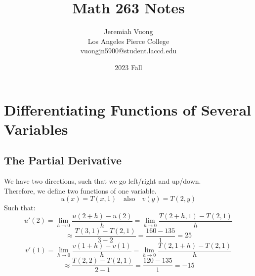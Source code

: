 \documentclass{article}
\title{\Huge{Math 263} Notes}
\author{\huge{Jeremiah Vuong}\\Los Angeles Pierce College\\vuongjn5900@student.laccd.edu
}
\date{2023 Fall}
\begin{document}
\maketitle
\newpage
{}
\pagebreak

\setcounter{section}{13}
\section{Differentiating Functions of Several Variables}
\subsection{The Partial Derivative}
\sol We have two directions, such that we go left/right and up/down.
\\ Therefore, we define two functions of one variable.
$$ u(x) = T(x, 1) \quad \text{also} \quad v(y) = T(2, y)$$
Such that:
$$ u'(2) = \lim _{h \rightarrow 0} \frac{u(2+h)-u(2)}{h} = \lim _{h \rightarrow 0} \frac{T(2+h, 1)-T(2, 1)}{h} $$
$$ \approx \frac{T(3,1) - T(2,1)}{3-2} = \frac{160 - 135}{1} = 25 $$
\newline
$$ v'(1) = \lim _{h \rightarrow 0} \frac{v(1+h)-v(1)}{h} = \lim _{h \rightarrow 0} \frac{T(2, 1 + h)-T(2, 1)}{h}$$
$$ \approx \frac{T(2,2) - T(2,1)}{2-1} = \frac{120 - 135}{1} = -15 $$
\end{document}
